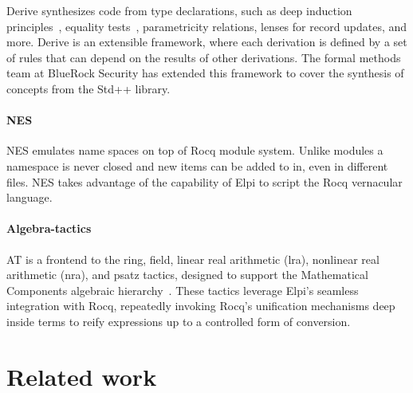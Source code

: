 \documentclass[sigplan,natbib=false]{acmart}
\begin{document}
Derive synthesizes code from type declarations, such as deep induction
principles~\cite{tassi:hal-01897468}, equality
tests~\cite{gregoire:hal-03800154}, parametricity relations, lenses for record
updates, and more. Derive is an extensible framework, where each derivation is
defined by a set of rules that can depend on the results of other derivations.
The formal methods team at BlueRock Security has extended this framework to
cover the synthesis of concepts from the Std++ library.

\paragraph{NES}
NES emulates name spaces on top of Rocq module system. Unlike modules a namespace
is never closed and new items can be added to in, even in different files. NES
takes advantage of the capability of Elpi to script the Rocq vernacular
language.

\paragraph{Algebra-tactics} AT
is a frontend to the ring, field, linear real arithmetic (lra),
nonlinear real arithmetic (nra), and psatz tactics, designed to support the
Mathematical Components algebraic
hierarchy~\cite{sakaguchi:LIPIcs.ITP.2022.29}. These tactics leverage Elpi's
seamless integration with Rocq, repeatedly invoking Rocq's unification mechanisms
deep inside terms to reify expressions up to a controlled form of conversion.

\section{Related work}

\end{document}

